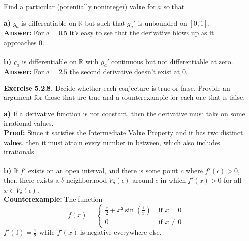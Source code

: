 \documentclass{article}
\begin{document}
	Find a particular (potentially noninteger) value for $a$ so that
	\begin{itemize}
		\textbf{a)} $g_a$ is differentiable on $\mathbb{R}$ but such that $g_a'$ is unbounded on $[0, 1]$. \\
		\textbf{Answer:} For $a = 0.5$ it's easy to see that the derivative blows up as it approaches 0.\\ \\
		\textbf{b)} $g_a$ is differentiable on $\mathbb{R}$ with $g_a'$ continuous but not differentiable at zero. \\
		\textbf{Answer:} For $a = 2.5$ the second derivative doesn't exist at 0. 
	\end{itemize}
	\textbf{Exercise 5.2.8.} Decide whether each conjecture is true or false. Provide an argument for those that are true and a counterexample for each one that is false.
	\begin{itemize}
		\textbf{a)} If a derivative function is not constant, then the derivative must take on some irrational values. \\
		\textbf{Proof:} Since it satisfies the Intermediate Value Property and it has two distinct values, then it must attain every number in between, which also includes irrationals. \\ \\
		\textbf{b)} If $f'$ exists on an open interval, and there is some point $c$ where $f'(c) > 0$, then there exists a $\delta$-neighborhood $V_\delta(c)$ around $c$ in which $f'(x) > 0$ for all $x \in V_\delta(c)$. \\
		\textbf{Counterexample:} The function 
		$$f(x) = \begin{cases}
			\frac{x}{2} + x^2\sin(\frac{1}{x}) & \text{ if } x = 0 \\
			0 & \text{ if } x \neq 0
		\end{cases}$$
		$f'(0) = \frac{1}{2}$ while $f'(x)$ is negative everywhere else. 
	\end{itemize}
\end{document}
